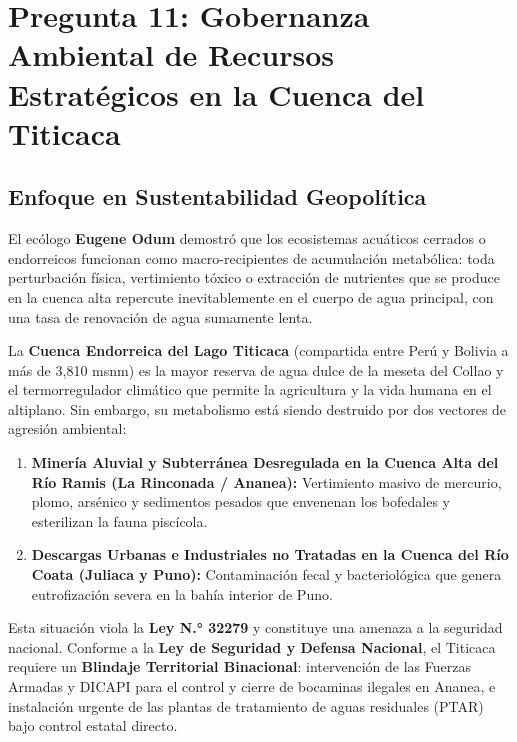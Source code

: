\documentclass[11pt,a4paper]{article}
\begin{document}
\newpage

\section{Pregunta 11: Gobernanza Ambiental de Recursos Estratégicos en la Cuenca del Titicaca}

\subsection{Enfoque en Sustentabilidad Geopolítica}
El ecólogo \textbf{Eugene Odum} demostró que los ecosistemas acuáticos cerrados o endorreicos funcionan como macro-recipientes de acumulación metabólica: toda perturbación física, vertimiento tóxico o extracción de nutrientes que se produce en la cuenca alta repercute inevitablemente en el cuerpo de agua principal, con una tasa de renovación de agua sumamente lenta.

La \textbf{Cuenca Endorreica del Lago Titicaca} (compartida entre Perú y Bolivia a más de 3,810 msnm) es la mayor reserva de agua dulce de la meseta del Collao y el termorregulador climático que permite la agricultura y la vida humana en el altiplano. Sin embargo, su metabolismo está siendo destruido por dos vectores de agresión ambiental:
\begin{enumerate}
    \item \textbf{Minería Aluvial y Subterránea Desregulada en la Cuenca Alta del Río Ramis (La Rinconada / Ananea):} Vertimiento masivo de mercurio, plomo, arsénico y sedimentos pesados que envenenan los bofedales y esterilizan la fauna piscícola.
    \item \textbf{Descargas Urbanas e Industriales no Tratadas en la Cuenca del Río Coata (Juliaca y Puno):} Contaminación fecal y bacteriológica que genera eutrofización severa en la bahía interior de Puno.
\end{enumerate}
Esta situación viola la \textbf{Ley N.° 32279} y constituye una amenaza a la seguridad nacional. Conforme a la \textbf{Ley de Seguridad y Defensa Nacional}, el Titicaca requiere un \textbf{Blindaje Territorial Binacional}: intervención de las Fuerzas Armadas y DICAPI para el control y cierre de bocaminas ilegales en Ananea, e instalación urgente de las plantas de tratamiento de aguas residuales (PTAR) bajo control estatal directo.
\end{document}
